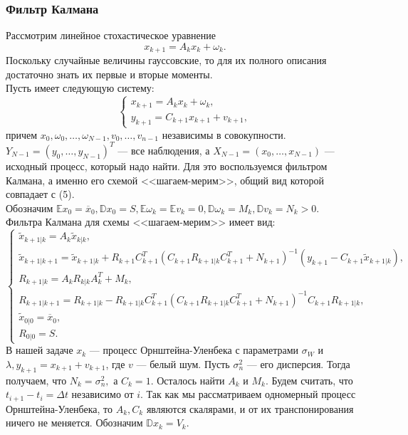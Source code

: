 \documentclass[11pt]{article}
\begin{document}
\subsubsection{Фильтр Калмана}
Рассмотрим линейное стохастическое уравнение
\[ x_{k+1} = A_kx_k + \omega_k. \]
Поскольку случайные величины гауссовские, то для их полного описания достаточно знать их первые и вторые моменты.\\
Пусть имеет следующую систему:
\begin{equation}
 \begin{cases}
x_{k+1} = A_kx_k + \omega_k, \\
y_{k+1} = C_{k+1}x_{k+1} + v_{k+1},
\end{cases} 
\end{equation}
причем $x_0,\omega_0,\dots,\omega_{N-1},v_0,\dots,v_{n-1}$ независимы в совокупности. $Y_{N-1} = (y_0,\dots,y_{N-1})^T$ --- все наблюдения, а $X_{N-1} = (x_0,\dots,x_{N-1})$ --- исходный процесс, который надо найти. Для это воспользуемся фильтром Калмана, а именно его схемой <<шагаем-мерим>>, общий вид которой совпадает с (5).\\
Обозначим $\mathbb{E}x_0 = \overline{x}_0, \mathbb{D}x_0 = S,\mathbb{E}\omega_k = \mathbb{E}v_k = 0, \mathbb{D}\omega_k = M_k,\mathbb{D}v_k = N_k > 0.$\\
Фильтра Калмана для схемы <<шагаем-мерим>> имеет вид:
\[  
\begin{cases}
\tilde{x}_{k+1|k} = A_k\tilde{x}_{k|k},\\
\tilde{x}_{k+1|k+1} = \tilde{x}_{k+1|k} + R_{k+1}C^T_{k+1}(C_{k+1}R_{k+1|k}C^T_{k+1} + N_{k+1})^{-1}(y_{k+1} - C_{k+1}\tilde{x}_{k+1|k}),\\
R_{k+1|k} = A_kR_{k|k}A^T_k + M_k,\\
R_{k+1|k+1} = R_{k+1|k} - R_{k+1|k}C^T_{k+1}(C_{k+1}R_{k+1|k}C^T_{k+1} + N_{k+1})^{-1}C_{k+1}R_{k+1|k},\\
\tilde{x}_{0|0} = \overline{x}_0,\\
R_{0|0} = S.
\end{cases}
\]
В нашей задаче $x_k$ --- процесс Орнштейна-Уленбека с параметрами $\sigma_W$ и $\lambda, y_{k+1} = x_{k+1} + v_{k+1}$, где $v$ ---  белый шум. Пусть $\sigma_n^2$ --- его дисперсия. Тогда получаем, что $N_k = \sigma_n^2,$ а $C_k = 1$. Осталось найти $A_k$ и $M_k$. Будем считать, что $t_{i+1} - t_i = \Delta t$ независимо от $i$. Так как мы рассматриваем одномерный процесс Орнштейна-Уленбека, то $A_k,C_k$ являются скалярами, и от их транспонирования ничего не меняется. Обозначим $\mathbb{D}x_k = V_k.$ \\
\end{document}
